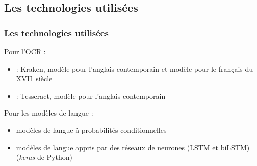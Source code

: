 \documentclass{beamer}
\begin{document}
		\subsection{Les technologies utilisées}
		\begin{frame}\frametitle{Les technologies utilisées}
		Pour l'OCR :
		\begin{itemize}
			\item \cite{Kiessling2019a} : Kraken, modèle pour l'anglais contemporain et modèle pour le français du XVII\ieme~siècle
			\item \cite{Smith2007a} : Tesseract, modèle pour l'anglais contemporain
		\end{itemize}

		Pour les modèles de langue :
		\begin{itemize}
			\item modèles de langue à probabilités conditionnelles
			\item modèles de langue appris par des réseaux de neurones (LSTM et biLSTM) (\textit{keras} de Python)
		\end{itemize}

		\end{frame}
\end{document}

